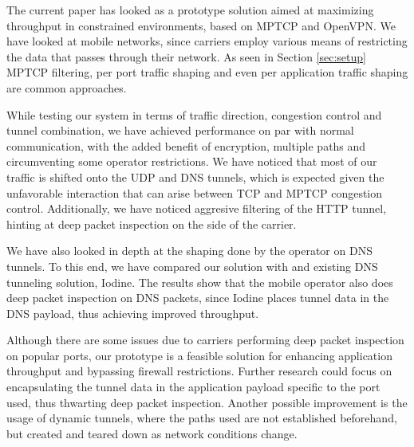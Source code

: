 
The current paper has looked as a prototype solution aimed at maximizing
throughput in constrained environments, based on MPTCP and OpenVPN. We have
looked at mobile networks, since carriers employ various means of restricting
the data that passes through their network. As seen in Section \ref{sec:setup}
MPTCP filtering, per port traffic shaping and even per application traffic
shaping are common approaches.

While testing our system in terms of traffic direction, congestion control and
tunnel combination, we have achieved performance on par with normal
communication, with the added benefit of encryption, multiple paths and
circumventing some operator restrictions. We have noticed that most of our
traffic is shifted onto the UDP and DNS tunnels, which is expected given the
unfavorable interaction that can arise between TCP and MPTCP congestion
control. Additionally, we have noticed aggresive filtering of the HTTP tunnel,
hinting at deep packet inspection on the side of the carrier.

We have also looked in depth at the shaping done by the operator on DNS
tunnels. To this end, we have compared our solution with and existing DNS
tunneling solution, Iodine. The results show that the mobile operator also
does deep packet inspection on DNS packets, since Iodine places tunnel data in
the DNS payload, thus achieving improved throughput.

Although there are some issues due to carriers performing deep packet
inspection on popular ports, our prototype is a feasible solution for
enhancing application throughput and bypassing firewall restrictions. Further
research could focus on encapsulating the tunnel data in the application
payload specific to the port used, thus thwarting deep packet inspection.
Another possible improvement is the usage of dynamic tunnels, where the paths
used are not established beforehand, but created and teared down as network
conditions change.
